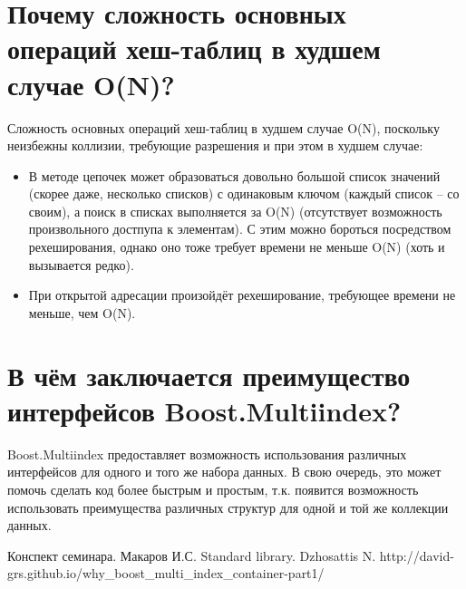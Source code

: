 \documentclass[a4paper,12pt]{article}	%
\begin{document}
\section{Почему сложность основных операций хеш-таблиц в худшем случае O(N)?}

	Сложность основных операций хеш-таблиц в худшем случае O(N), поскольку неизбежны коллизии, требующие разрешения и при этом в худшем случае:
	
	\begin{itemize}
	
		\item В методе цепочек может образоваться довольно большой список значений (скорее даже, несколько списков) с одинаковым ключом (каждый список -- со своим), а поиск в списках выполняется за O(N) (отсутствует возможность произвольного достпупа к элементам). С этим можно бороться посредством рехеширования, однако оно тоже требует времени не меньше O(N) (хоть и вызывается редко).
		
		\item При открытой адресации произойдёт рехеширование, требующее времени не меньше, чем O(N).
	
	\end{itemize}

\section{В чём заключается преимущество интерфейсов Boost.Multiindex?}

	Boost.Multiindex предоставляет возможность использования различных интерфейсов для одного и того же набора данных. В свою очередь, это может помочь сделать код более быстрым и простым, т.к. появится возможность использовать преимущества различных структур для одной и той же коллекции данных.
	
\newpage


 
	\begin{thebibliography}{}
	
		 Конспект семинара. Макаров И.С.
		 Standard library. Dzhosattis N.
		 http://david-grs.github.io/why\_boost\_multi\_index\_container-part1/
		
	\end{thebibliography}
\end{document}
